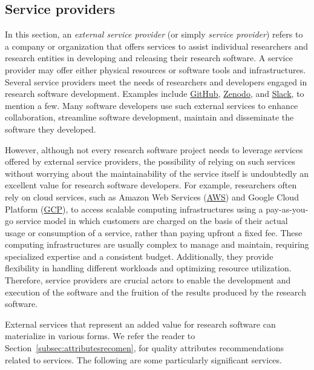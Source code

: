 \subsection{Service providers}

In this section, an \textit{external service provider} (or simply \textit{service provider}) refers to a company or organization that offers services to assist individual researchers and research entities in developing and releasing their research software. A service provider may offer either physical resources or software tools and infrastructures. Several service providers meet the needs of researchers and developers engaged in research software development. Examples include \href{https://github.com}{GitHub}, \href{https://zenodo.org/}{Zenodo}, and \href{https://slack.com}{Slack}, to mention a few. Many software developers use such external services to enhance collaboration, streamline software development, maintain and disseminate the software they developed. 

However, although not every research software project needs to leverage services offered by external service providers, the possibility of relying on such services without worrying about the maintainability of the service itself is undoubtedly an excellent value for research software developers. For example, researchers often rely on cloud services, such as Amazon Web Services (\href{https://aws.amazon.com/}{AWS}) and Google Cloud Platform (\href{https://cloud.google.com/}{GCP}), to access scalable computing infrastructures using a pay-as-you-go service model in which customers are charged on the basis of their actual usage or consumption of a service, rather than paying upfront a fixed fee. These computing infrastructures are usually complex to manage and maintain, requiring specialized expertise and a consistent budget. Additionally, they provide flexibility in handling different workloads and optimizing resource utilization. Therefore, service providers are crucial actors to enable the development and execution of the software and the fruition of the results produced by the research software.

External services that represent an added value for research software can materialize in various forms. We refer the reader to Section~\ref{subsec:attributesrecomen}, for quality attributes recommendations related to services. The following are some particularly significant services.

